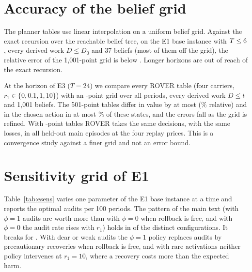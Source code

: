 \documentclass[11pt]{article}
\theoremstyle{definition}
\begin{document}
\section{Accuracy of the belief grid}

The planner tables use linear interpolation on a uniform belief grid. Against the exact recursion over the
reachable belief tree, on the E1 base instance with $T\le6$, every derived work $D\le D_0$ and 37
beliefs (most of them off the grid), the relative error of the 1{,}001-point grid is below \GridMaxRel.
Longer horizons are out of reach of the exact recursion.

At the horizon of E3 ($T=24$) we compare every ROVER table (four carriers, $r_1\in\{0,0.1,1,10\}$) with an
\PostGridRef-point grid over all periods, every derived work $D\le t$ and 1{,}001 beliefs. The 501-point
tables differ in value by at most \PostGridMaxErr{} (\PostGridMaxRel\% relative) and in the chosen action in at
most \PostGridActDis\% of these states, and the errors fall as the grid is refined. With \PostGridDense-point
tables ROVER takes the same decisions, with the same losses, in all \PostGridIdent{} held-out main episodes at
the four replay prices. This is a convergence study against a finer grid and not an error bound.

\section{Sensitivity grid of E1}

Table~\ref{tab:esens} varies one parameter of the E1 base instance at a time and reports the optimal audits
per 100 periods. The pattern of the main text (with $\phi=1$ audits are worth more than with $\phi=0$ when
rollback is free, and with $\phi=0$ the audit rate rises with $r_1$) holds in \EOneSensHolds{} of the
\EOneSensTotal{} distinct configurations. It breaks for \EOneSensBreaks. With dear or weak audits the
$\phi=1$ policy replaces audits by precautionary recoveries when rollback is free, and with rare
activations neither policy intervenes at $r_1=10$, where a recovery costs more than the expected harm.

\begin{table}[h]
\centering
\caption{E1 sensitivity grid: optimal audits per 100 periods for $\phi\in\{0,1\}$ and $r_1\in\{0,1,10\}$,
one parameter changed at a time from the base instance.}\label{tab:esens}

\end{table}
\end{document}
